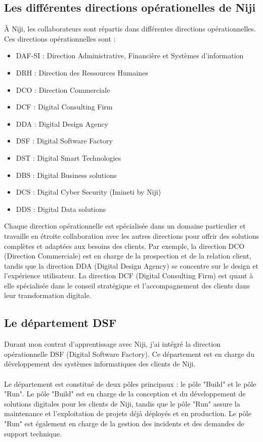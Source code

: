 \documentclass[12pt]{article}
\begin{document}
\subsection{Les différentes directions opérationelles de Niji}
À Niji, les collaborateurs sont répartis dans différentes directions opérationnelles. \\Ces directions opérationnelles sont :
\begin{itemize}
    \item DAF-SI : Direction Administrative, Financière et Systèmes d'information
    \item DRH : Direction des Ressources Humaines
    \item DCO : Direction Commerciale
    \item DCF : Digital Consulting Firm
    \item DDA : Digital Design Agency
    \item DSF : Digital Software Factory
    \item DST : Digital Smart Technologies
    \item DBS : Digital Business solutions
    \item DCS : Digital Cyber Security (Imineti by Niji)
    \item DDS : Digital Data solutions
\end{itemize}
\vspace{0.5cm}
Chaque direction opérationnelle est spécialisée dans un domaine particulier et travaille en étroite collaboration avec les autres directions pour offrir des solutions complètes et adaptées aux besoins des clients. Par exemple, la direction DCO (Direction Commerciale) est en charge de la prospection et de la relation client, tandis que la direction DDA (Digital Design Agency) se concentre sur le design et l'expérience utilisateur. La direction DCF (Digital Consulting Firm) est quant à elle spécialisée dans le conseil stratégique et l'accompagnement des clients dans leur transformation digitale.

\subsection{Le département DSF}
Durant mon contrat d'apprentissage avec Niji, j'ai intégré la direction opérationnelle DSF (Digital Software Factory). Ce département est en charge du développement des systèmes informatiques des clients de Niji.
\\\\
Le département est constitué de deux pôles principaux : le pôle "Build" et le pôle "Run". Le pôle "Build" est en charge de la conception et du développement de solutions digitales pour les clients de Niji, tandis que le pôle "Run" assure la maintenance et l'exploitation de projets déjà déployés et en production. Le pôle "Run" est également en charge de la gestion des incidents et des demandes de support technique.
\end{document}
